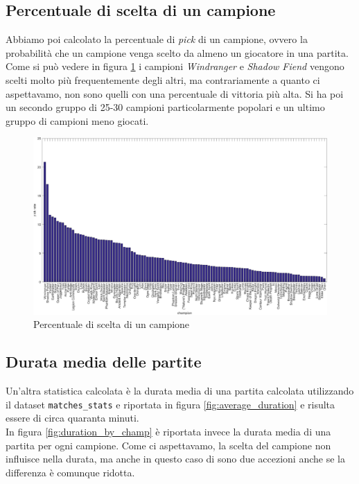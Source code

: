 \documentclass[a4paper,12pt,openany,oneside]{book}
\begin{document}
\subsection{Percentuale di scelta di un campione}
Abbiamo poi calcolato la percentuale di \textit{pick} di un campione, ovvero la probabilità che un campione venga scelto da almeno un giocatore in una partita. Come si può vedere in figura \ref{fig:pick_rate} i campioni \textit{Windranger} e \textit{Shadow Fiend} vengono scelti molto più frequentemente degli altri, ma contrariamente a quanto ci aspettavamo, non sono quelli con una percentuale di vittoria più alta. Si ha poi un secondo gruppo di 25-30 campioni particolarmente popolari e un ultimo gruppo di campioni meno giocati.

\begin{figure}[H]
	\includegraphics[width=\linewidth]{pics/pick_rate.png}
	\caption{Percentuale di scelta di un campione}
	\label{fig:pick_rate}
\end{figure}

\subsection{Durata media delle partite}
Un'altra statistica calcolata è la durata media di una partita calcolata utilizzando il dataset \verb|matches_stats| e riportata in figura \ref{fig:average_duration} e risulta essere di circa quaranta minuti.
\\
In figura \ref{fig:duration_by_champ} è riportata invece la durata media di una partita per ogni campione. Come ci aspettavamo, la scelta del campione non influisce nella durata, ma anche in questo caso di sono due accezioni anche se la differenza è comunque ridotta.
\end{document}
